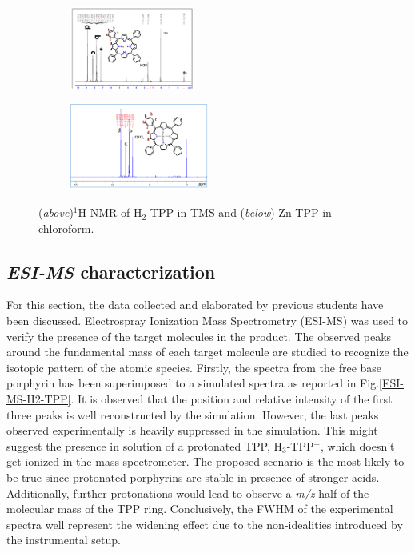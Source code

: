 \documentclass[num-refs]{wiley-article}
\begin{document}
\begin{figure}
    \centering
    \begin{subfigure}
        \centering
        \includegraphics[width=0.45\textwidth]{1H-NMR-H2-TPP}
    \end{subfigure}
    \begin{subfigure}
        \centering
        \includegraphics[width=0.5\textwidth]{1H-NMR-Zn-TPP}
    \end{subfigure}
    \caption{(\textit{above})$^{1}$H-NMR of H$_{2}$-TPP in TMS and (\textit{below}) Zn-TPP in chloroform.}
    \label{NMR}
\end{figure}
\subsection{\textit{ESI-MS} characterization}
For this section, the data collected and elaborated by previous students have been discussed.
Electrospray Ionization Mass Spectrometry (ESI-MS) was used to verify the presence of the target molecules in the product.
The observed peaks around the fundamental mass of each target molecule are studied to recognize the isotopic pattern of the atomic species.
Firstly, the spectra from the free base porphyrin has been superimposed to a simulated spectra as reported in Fig.\ref{ESI-MS-H2-TPP}.
It is observed that the position and relative intensity of the first three peaks is well reconstructed by the simulation.
However, the last peaks observed experimentally is heavily suppressed in the simulation.
This might suggest the presence in solution of a protonated TPP, H$_{3}$-TPP$^{+}$, which doesn't get ionized in the mass spectrometer.
The proposed scenario is the most likely to be true since protonated porphyrins are stable in presence of stronger acids.
Additionally, further protonations would lead to observe a \textit{m/z} half of the molecular mass of the TPP ring.
Conclusively, the FWHM of the experimental spectra well represent the widening effect due to the non-idealities introduced by the instrumental setup.\\
\end{document}
